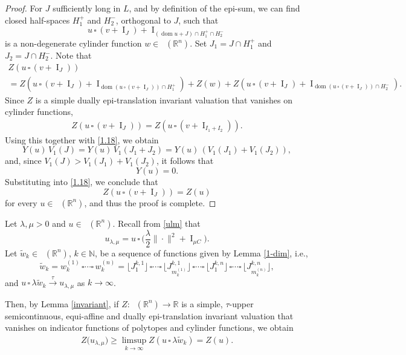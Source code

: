 \documentclass[11pt]{article}
\theoremstyle{definition} %
\newcommand{\RR}{(\mathbb{R}^n)}
\DeclareMathOperator{\I}{I}
\DeclareMathOperator{\dom}{dom}
\DeclareMathOperator{\LP}{Conv_{lp}}
\newcommand{\seq}{\xrightarrow{\tau}}
\begin{document}
\begin{proof}
For $J$ sufficiently long in $L$, and by definition of the epi-sum, we can find closed half-spaces $H_1^+$ and $H_2^-$,  orthogonal to $J$,  such that   
$$u\,\square\, (v+\I_{J})+\I_{(\dom u+ J)\cap H_1^+\cap H_2^-}$$ 
is a non-degenerate cylinder function $w\in \LP\RR$. Set $J_1=J\cap H_1^+$ and $J_2=J\cap H_2^-$. Note that 
\begin{multline*}
    Z(u\,\square\, (v+\I_{J}))\\
    = Z(u\,\square\, (v+\I_{J})+\I_{\dom (u\,\square\, (v+\I_{J}))\cap H_1^+})+ Z(w)+Z(u\,\square\, (v+\I_{J})+\I_{\dom (u\,\square\, (v+\I_{J}))\cap H_2^-}).
\end{multline*}
Since $Z$ is a simple dually epi-translation invariant valuation that vanishes on cylinder functions,
\begin{align*}
    Z(u\,\square\, (v+\I_{J}))= Z(u\,\square\, (v+\I_{I_1+I_2})).
\end{align*}
Using this together with \eqref{1.18}, we obtain
$$ Y(u)\,V_1(J)= Y(u)\,V_1(J_1+J_2)= Y(u)\,(V_1(J_1)+V_1(J_2)),$$
and, since $V_1(J)>V_1(J_1)+V_1(J_2)$, it follows that
$$Y(u)=0.$$
Substituting into \eqref{1.18}, we conclude that 
$$Z(u\,\square\, (v+\I_{J}))= Z(u)$$
for every $u\in \LP\RR$,  and thus the proof is complete.
\end{proof}





Let $\lambda,\mu>0$ and $u\in \LP(\mathbb{R}^n)$. Recall from \eqref{ulm} that
\begin{equation}
     u_{\lambda,\mu}= u\,\square\, \Big(\frac{\lambda}{2}\|\cdot\|^2+\I_{\mu C}\Big).
\end{equation}
Let $\tilde{w}_k\in \LP(\mathbb{R}^n)$, $k \in \mathbb{N}$, be a sequence of functions given by Lemma \ref{1-dim}, i.e.,
$$\tilde{w}_k=  w_k^{(1)} \, \square \cdots \square \,  w_k^{(n)} = \lfloor J_1^{k,1} \rfloor \,\square \cdots \square\, \lfloor J_{m_k^{(1)}}^{k,1} \rfloor \,\square \cdots \square\, \lfloor J_1^{k,n} \rfloor \,\square \cdots \square\, \lfloor J_{m_k^{(n)}}^{k,n} \rfloor,$$
and $u\,\square\, \lambda \tilde{w}_k \seq u_{\lambda,\mu}$ as  $k\to \infty$.

Then, by Lemma \ref{invariant}, if $Z:\LP\RR\rightarrow\mathbb{R}$ is a simple, $\tau$-upper semicontinuous, equi-affine and  dually epi-translation   invariant valuation that   vanishes on  indicator functions of polytopes and cylinder functions, we obtain
\begin{align}\label{bigger}
Z\bigl(u_{\lambda,\mu}\bigr)\geq \limsup_{k\rightarrow \infty} Z\left(u\,\square\, \lambda \tilde{w}_k\right)=  Z(u). 
\end{align}
\end{document}
